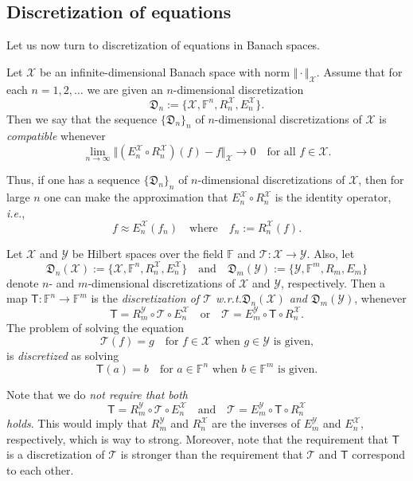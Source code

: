 \documentclass[a4paper]{paper}
\makeatletter
\newcommand{\Discr}{\mathfrak{D}}
\newcommand{\VecSpace}[1]{\mathscr{#1}}
\newcommand{\Field}{\mathbb{F}}
\newcommand{\Op}[1]{\mathcal{#1}}
\newcommand{\DiscOp}[1]{\mathsf{#1}}
\newcommand*{\EXT}[2]{\ensuremath{E_{#1}^{#2}}}
\newcommand*{\REST}[2]{\ensuremath{R_{#1}^{#2}}}
\newcommand*{\RnX}{\ensuremath{\REST{n}{\VecSpace{X}}}}
\newcommand*{\RmY}{\ensuremath{\REST{m}{\VecSpace{Y}}}}
\newcommand*{\EnX}{\ensuremath{\EXT{n}{\VecSpace{X}}}}
\newcommand*{\EmY}{\ensuremath{\EXT{m}{\VecSpace{Y}}}}
\newcommand{\ie}{\textsl{i.e.}\xspace}
\newcommand{\wrt}{{w.r.t.}\@\xspace}
\makeatother
\begin{document}
\subsection{Discretization of equations}
Let us now turn to discretization of equations in Banach spaces.
\begin{definition} 
  Let $\VecSpace{X}$ be an infinite-dimensional Banach space with norm $\Vert \cdot \Vert_{\VecSpace{X}}$. 
  Assume that for each $n=1,2,\ldots$ we are given an $n$-dimensional  discretization
  \[ \Discr_{n} := \{ \VecSpace{X}, \Field^{n}, \RnX,\EnX \}. \]
  Then we say that the  sequence $\{ \Discr_{n} \}_{n}$ of $n$-dimensional discretizations 
  of $\VecSpace{X}$ is \emph{compatible} whenever
  \[ \lim_{n\to \infty} 
     \bigl\Vert ( \EnX\circ \RnX)(f)-f \bigr\Vert_{\VecSpace{X}}\to 0
    \quad\text{for all $f\in \VecSpace{X}$.}\]
\end{definition}
Thus, if one has a sequence $\{ \Discr_{n} \}_{n}$ of $n$-dimensional discretizations 
of $\VecSpace{X}$, then for large $n$ one can make the approximation that 
$\EnX\circ  \RnX$ is the identity operator, \ie,
\begin{equation}\label{eq:fApprox}
  f \approx \EnX(f_{n}) \quad\text{where}\quad
  f_{n}:=\RnX(f).
\end{equation}
\begin{definition}
  Let $\VecSpace{X}$ and $\VecSpace{Y}$ be Hilbert spaces over the field $\Field$ and $\Op{T} \colon \VecSpace{X} \to \VecSpace{Y}$. 
  Also, let 
  \[  \Discr_{n}(\VecSpace{X}):=\bigl\{ \VecSpace{X},\Field^{n},\RnX,\EnX \bigr\} 
     \quad\text{and}\quad
     \Discr_{m}(\VecSpace{Y}):=\bigl\{ \VecSpace{Y},\Field^{m},R_{m},E_{m} \bigr\}\]
  denote $n$- and $m$-dimensional discretizations of $\VecSpace{X}$ and $\VecSpace{Y}$, 
  respectively. Then a map $\DiscOp{T} \colon \Field^{n} \to \Field^{m}$ is the
  \emph{discretization of $\Op{T}$ \wrt $\Discr_{n}(\VecSpace{X})$ and $\Discr_{m}(\VecSpace{Y})$},  
  whenever 
  \[ \DiscOp{T} = \RmY \circ \Op{T} \circ \EnX \quad\text{or}\quad
    \Op{T} = \EmY \circ \DiscOp{T} \circ \RnX. \]
  The problem of  solving the equation
   \[  \Op{T}(f)=g \quad\text{for $f\in \VecSpace{X}$ when $g\in \VecSpace{Y}$ is given,} \]
  is \emph{discretized} as solving 
  \[   \DiscOp{T}(a)=b \quad\text{for $a\in \Field^{n}$ when $b\in \Field^{m}$ is given.} \]
\end{definition}  
\begin{remark}
Note that we do \emph{not require that both  
\[ \DiscOp{T} = \RmY \circ \Op{T} \circ \EnX \quad\text{and}\quad
    \Op{T} = \EmY \circ \DiscOp{T} \circ \RnX \]
holds}. This would imply that  $\RmY$ and $\RnX$ are the inverses of $\EmY$ and 
$\EnX$, respectively, which is way to strong. Moreover, note that the requirement that 
$\DiscOp{T}$ is a discretization of $\Op{T}$ is stronger than  the requirement that 
$\Op{T}$ and $\DiscOp{T}$ correspond to each other.
\end{remark}
\end{document}
